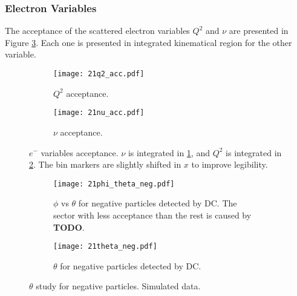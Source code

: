 \subsubsection{Electron Variables}
\label{14.21::electron_variables}
    The acceptance of the scattered electron variables $Q^2$ and $\nu$ are presented in Figure \ref{fig::14.21::electron_acc}.
    Each one is presented in integrated kinematical region for the other variable.

    \begin{figure}[t!]
        \centering
        \begin{subfigure}[b]{\textwidth}
            \centering
            \texttt{[image: 21q2\_acc.pdf]}
            \caption{$Q^2$ acceptance.}
            \label{fig::14.21::q2_acc}
        \end{subfigure}
        \hfill
        \begin{subfigure}[b]{\textwidth}
            \centering
            \texttt{[image: 21nu\_acc.pdf]}
            \caption{$\nu$ acceptance.}
            \label{fig::14.21::nu_acc}
        \end{subfigure}
        \caption[$e^-$ variables acceptance]
        {$e^-$ variables acceptance.
        $\nu$ is integrated in \ref{fig::14.21::q2_acc}, and $Q^2$ is integrated in \ref{fig::14.21::nu_acc}.
        The bin markers are slightly shifted in $x$ to improve legibility.}
        \label{fig::14.21::electron_acc}
    \end{figure}

    \begin{figure}
        \centering
        \begin{subfigure}[b]{\textwidth}
            \centering
            \texttt{[image: 21phi\_theta\_neg.pdf]}
            \caption[$\phi$ vs $\theta$ for negative particles]
            {$\phi$ vs $\theta$ for negative particles detected by DC.
            The sector with less acceptance than the rest is caused by \textbf{TODO}.}
            \label{fig::14.21::phi_theta_neg}
        \end{subfigure}
        \begin{subfigure}[b]{\textwidth}
            \centering
            \texttt{[image: 21theta\_neg.pdf]}
            \caption[$\theta$ for negative particles]
            {$\theta$ for negative particles detected by DC.}
            \label{fig::14.21::theta_neg}
        \end{subfigure}
        \caption[$\theta$ study for negative particles]
        {$\theta$ study for negative particles.
        Simulated data.}
        \label{fig::14.21::theta_study_neg}
    \end{figure}


